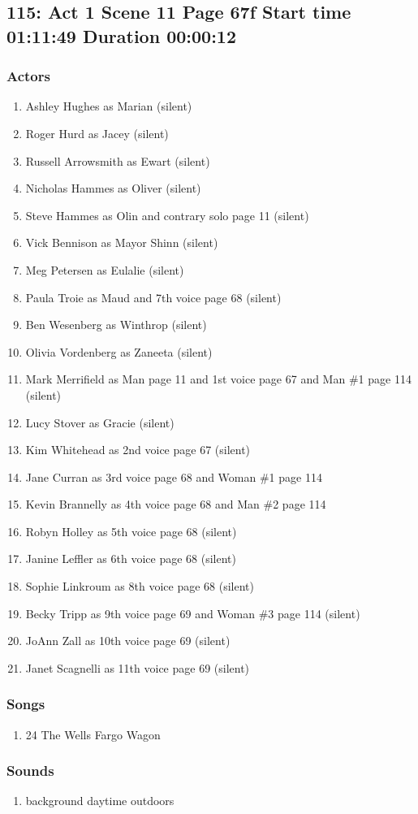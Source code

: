 \subsection{115: Act 1 Scene 11 Page 67f Start time 01:11:49 Duration 00:00:12}

\subsubsection{Actors}
\begin{enumerate}
\item Ashley Hughes as Marian (silent)
\item Roger Hurd as Jacey (silent)
\item Russell Arrowsmith as Ewart (silent)
\item Nicholas Hammes as Oliver (silent)
\item Steve Hammes as Olin and contrary solo page 11 (silent)
\item Vick Bennison as Mayor Shinn (silent)
\item Meg Petersen as Eulalie (silent)
\item Paula Troie as Maud and 7th voice page 68 (silent)
\item Ben Wesenberg as Winthrop (silent)
\item Olivia Vordenberg as Zaneeta (silent)
\item Mark Merrifield as Man page 11 and 1st voice page 67 and Man \#1 page 114 (silent)
\item Lucy Stover as Gracie (silent)
\item Kim Whitehead as 2nd voice page 67 (silent)
\item Jane Curran as 3rd voice page 68 and Woman \#1 page 114
\item Kevin Brannelly as 4th voice page 68 and Man \#2 page 114
\item Robyn Holley as 5th voice page 68 (silent)
\item Janine Leffler as 6th voice page 68 (silent)
\item Sophie Linkroum as 8th voice page 68 (silent)
\item Becky Tripp as 9th voice page 69 and Woman \#3 page 114 (silent)
\item JoAnn Zall as 10th voice page 69 (silent)
\item Janet Scagnelli as 11th voice page 69 (silent)
\end{enumerate}

\subsubsection{Songs}
\begin{enumerate}
\item 24 The Wells Fargo Wagon
\end{enumerate}\subsubsection{Sounds}
\begin{enumerate}
\item background daytime outdoors
\end{enumerate}
